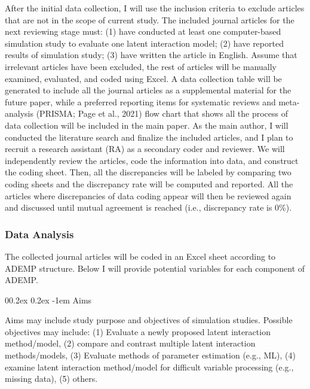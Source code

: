 \documentclass[
  man]{apa6}
\makeatletter
\let\oldparagraph\paragraph
\renewcommand{\paragraph}[1]{\oldparagraph{#1}\mbox{}}
\renewcommand{\paragraph}{\@startsection{paragraph}{4}{\parindent}%
  {0\baselineskip \@plus 0.2ex \@minus 0.2ex}%
  {-1em}%
  {\normalfont\normalsize\bfseries\itshape\typesectitle}}
\makeatother
\begin{document}
After the initial data collection, I will use the inclusion criteria to exclude articles that are not in the scope of current study. The included journal articles for the next reviewing stage must: (1) have conducted at least one computer-based simulation study to evaluate one latent interaction model; (2) have reported results of simulation study; (3) have written the article in English. Assume that irrelevant articles have been excluded, the rest of articles will be manually examined, evaluated, and coded using Excel. A data collection table will be generated to include all the journal articles as a supplemental material for the future paper, while a preferred reporting items for systematic reviews and meta-analysis (PRISMA; Page et al., 2021) flow chart that shows all the process of data collection will be included in the main paper. As the main author, I will conducted the literature search and finalize the included articles, and I plan to recruit a research assistant (RA) as a secondary coder and reviewer. We will independently review the articles, code the information into data, and construct the coding sheet. Then, all the discrepancies will be labeled by comparing two coding sheets and the discrepancy rate will be computed and reported. All the articles where discrepancies of data coding appear will then be reviewed again and discussed until mutual agreement is reached (i.e., discrepancy rate is 0\%).

\hypertarget{data-analysis}{%
\subsubsection{Data Analysis}\label{data-analysis}}

The collected journal articles will be coded in an Excel sheet according to ADEMP structure. Below I will provide potential variables for each component of ADEMP.

\hypertarget{aims}{%
\paragraph{Aims}\label{aims}}

Aims may include study purpose and objectives of simulation studies. Possible objectives may include: (1) Evaluate a newly proposed latent interaction method/model, (2) compare and contrast multiple latent interaction methods/models, (3) Evaluate methods of parameter estimation (e.g., ML), (4) examine latent interaction method/model for difficult variable processing (e.g., missing data), (5) others.
\end{document}
